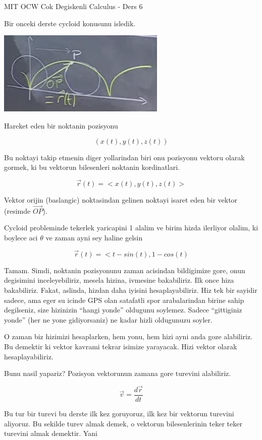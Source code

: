 \documentclass[12pt,fleqn]{article}
\begin{document}
MIT OCW Cok Degiskenli Calculus - Ders 6

Bir onceki derste cycloid konusunu isledik. 

\includegraphics[height=4cm]{6_1.png}

Hareket eden bir noktanin pozisyonu

\[ (x(t), y(t), z(t)) \]

Bu noktayi takip etmenin diger yollarindan biri onu pozisyonu vektoru
olarak gormek, ki bu vektorun bilesenleri noktanin kordinatlari. 

\[ \vec{r}(t) = <x(t),y(t),z(t)> \]

Vektor orijin (baslangic) noktasindan gelinen noktayi isaret eden bir
vektor (resimde $\vec{OP}$). 

Cycloid probleminde tekerlek yaricapini 1 alalim ve birim hizda ilerliyor
olalim, ki boylece aci $\theta$ ve zaman ayni sey haline gelsin

\[ \vec{r}(t) = <t-sin(t), 1-cos(t) \]

Tamam. Simdi, noktanin pozisyonunu zaman acisindan bildigimize gore, onun
degisimini inceleyebiliriz, mesela hizina, ivmesine bakabiliriz. Ilk once
hiza bakabiliriz. Fakat, aslinda, hizdan daha iyisini hesaplayabiliriz. Hiz
tek bir sayidir sadece, ama eger su icinde GPS olan satafatli spor
arabalarindan birine sahip degilseniz, size hizinizin ``hangi yonde''
oldugunu soylemez. Sadece ``gittiginiz yonde'' (her ne yone gidiyorsaniz)
ne kadar hizli oldugunuzu soyler.

O zaman biz hizimizi hesaplarken, hem yonu, hem hizi ayni anda goze
alabiliriz. Bu demektir ki vektor kavrami tekrar isimize yarayacak. Hizi
vektor olarak hesaplayabiliriz. 

Bunu nasil yapariz? Pozisyon vektorunun zamana gore turevini alabiliriz.

\[ \vec{v} = \frac{d\vec{r}}{dt} \]

Bu tur bir turevi bu derste ilk kez goruyoruz, ilk kez bir vektorun
turevini aliyoruz. Bu sekilde turev almak demek, o vektorun bilesenlerinin
teker teker turevini almak demektir. Yani
\end{document}
